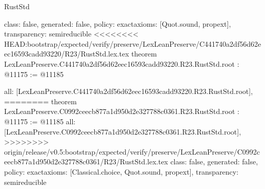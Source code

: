 \begin{lexlean}{RustStd}
\begin{coremodule}
{\begin{coremodule}
{{{{{{{{{{{{{{  class: false,
  generated: false,
  policy: exact{axioms: [Quot.sound, propext]},
  transparency: semireducible
}
<<<<<<<< HEAD:bootstrap/expected/verify/preserve/LexLeanPreserve/C441740a2df56d62eec16593cadd93220/R23/RustStd.lex.tex
theorem LexLeanPreserve.C441740a2df56d62eec16593cadd93220.R23.RustStd.root : @11175 := @11185 {
  all: [LexLeanPreserve.C441740a2df56d62eec16593cadd93220.R23.RustStd.root],
========
theorem LexLeanPreserve.C0992ceecb877a1d950d2e327788c0361.R23.RustStd.root : @11175 := @11185 {
  all: [LexLeanPreserve.C0992ceecb877a1d950d2e327788c0361.R23.RustStd.root],
>>>>>>>> origin/release/v0.5:bootstrap/expected/verify/preserve/LexLeanPreserve/C0992ceecb877a1d950d2e327788c0361/R23/RustStd.lex.tex
  class: false,
  generated: false,
  policy: exact{axioms: [Classical.choice, Quot.sound, propext]},
  transparency: semireducible
}

}}}}}}}}}}}}}}
\end{coremodule}}
\end{coremodule}
\end{lexlean}
